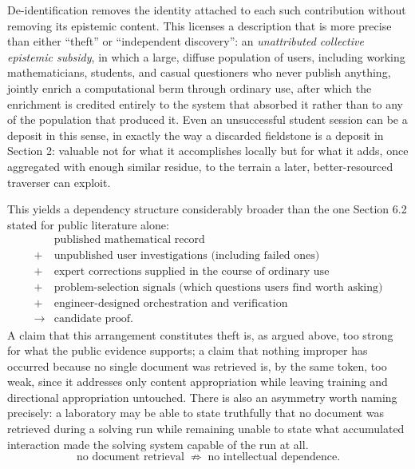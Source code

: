 \documentclass[11pt]{article}
\begin{document}
De-identification removes the identity attached to each such contribution without removing its epistemic content. This licenses a description that is more precise than either ``theft'' or ``independent discovery'': an \emph{unattributed collective epistemic subsidy}, in which a large, diffuse population of users, including working mathematicians, students, and casual questioners who never publish anything, jointly enrich a computational berm through ordinary use, after which the enrichment is credited entirely to the system that absorbed it rather than to any of the population that produced it. Even an unsuccessful student session can be a deposit in this sense, in exactly the way a discarded fieldstone is a deposit in Section 2: valuable not for what it accomplishes locally but for what it adds, once aggregated with enough similar residue, to the terrain a later, better-resourced traverser can exploit.

This yields a dependency structure considerably broader than the one Section 6.2 stated for public literature alone:
\[
\begin{aligned}
&\text{published mathematical record}\\
+{}&\text{unpublished user investigations (including failed ones)}\\
+{}&\text{expert corrections supplied in the course of ordinary use}\\
+{}&\text{problem-selection signals (which questions users find worth asking)}\\
+{}&\text{engineer-designed orchestration and verification}\\
\longrightarrow{}&
\text{candidate proof.}
\end{aligned}
\]
A claim that this arrangement constitutes theft is, as argued above, too strong for what the public evidence supports; a claim that nothing improper has occurred because no single document was retrieved is, by the same token, too weak, since it addresses only content appropriation while leaving training and directional appropriation untouched. There is also an asymmetry worth naming precisely: a laboratory may be able to state truthfully that no document was retrieved during a solving run while remaining unable to state what accumulated interaction made the solving system capable of the run at all.
\[
\text{no document retrieval}
\;\not\Longrightarrow\;
\text{no intellectual dependence}.
\]
\end{document}
